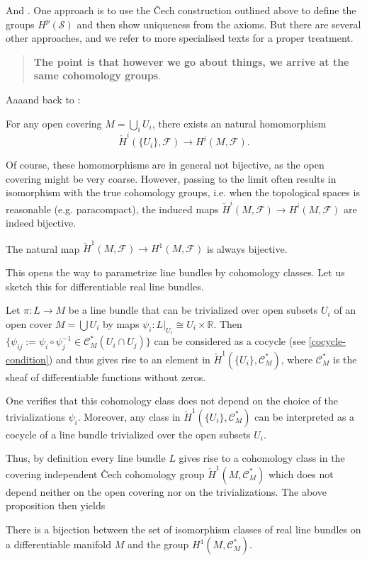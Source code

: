 \documentclass{article}
\newcommand{\R}{\mathbb{R}}
\newcommand{\Cc}{\mathcal{C}}
\newcommand{\Fc}{\mathcal{F}}
\newcommand{\Sc}{\mathcal{S}}
\begin{document}
And \cite{donaldson}. One approach is to use the \v Cech construction outlined above to define the groups $H^p(\Sc)$ and then show uniqueness from the axioms. But there are several other approaches, and we refer to more specialised texts for a proper treatment.

\begin{quote}
	{\color{red}\textbf{The point is that however we go about things, we arrive at the same cohomology groups}.}
\end{quote}

Aaaand back to \cite{huybrechts}:
\begin{prop}
	For any open covering $M=\bigcup_iU_i$, there exists an natural homomorphism
	\[\check{H}^i(\{U_i\},\Fc)\to H^i(M,\Fc).\]
\end{prop}
Of course, these homomorphisms are in general not bijective, as the open
covering might be very coarse. However, passing to the limit often results in isomorphism with the true cohomology groups, i.e. when the topological spaces is reasonable (e.g. paracompact), the induced maps $\check{H}^i(M,\Fc)\to H^i(M,\Fc)$ are indeed bijective.
\begin{prop}
	The natural map $\check{H}^1(M,\Fc)\to H^1(M,\Fc)$ is always bijective.
\end{prop}
This opens the way to parametrize line bundles by cohomology classes. Let us sketch this for differentiable real line bundles.

Let $\pi:L\to M$ be a line bundle that can be trivialized over open subsets $U_i$ of an open cover $M=\bigcup U_i$ by maps $\psi_i:L|_{U_i}\cong U_i\times \R$. Then $\{\psi_{ij}:=\psi_i\circ\psi^{-1}_j\in\Cc_M^*(U_i\cap U_j)\}$ {\color{red}can be considered as a cocycle (see \cref{cocycle-condition})} and thus gives rise to an element in $\check{H}^1(\{U_i\},\Cc_M^*)$, where $\Cc^*_M$ is the sheaf of differentiable functions without zeros.

One verifies that this cohomology class does not depend on the choice of the trivializations $\psi_i$. Moreover, any class in $\check{H}^1(\{U_i\},\Cc_M^*)$ can be interpreted as a cocycle of a line bundle trivialized over the open subsets $U_i$.

Thus, by definition every line bundle $L$ gives rise to a cohomology class in the covering independent \v Cech cohomology group $\check{H}^1(M,\Cc^*_M)$ which does not depend neither on the open covering nor on the trivializations. The above proposition then yields

\begin{coro}
	There is a bijection between the set of isomorphism classes of real line bundles on a differentiable manifold $M$ and the group $H^1(M,\Cc^*_M)$.
\end{coro}
\end{document}
